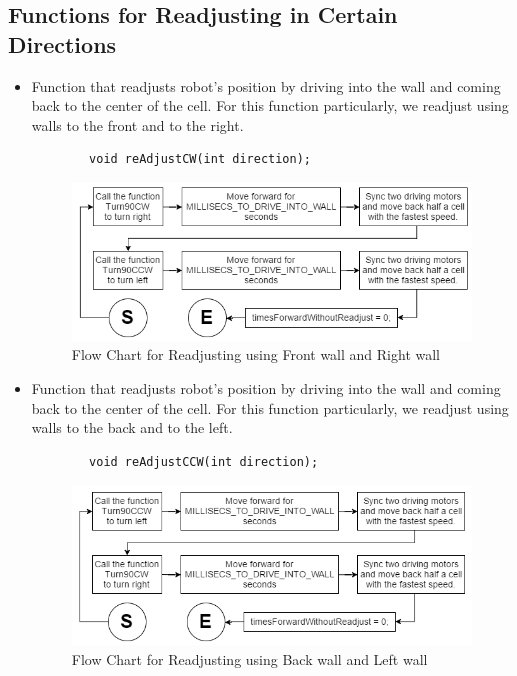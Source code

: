 \documentclass[11pt]{article}
\begin{document}
\subsection{Functions for Readjusting in Certain Directions}
\begin{itemize}
\item Function that readjusts robot's position by driving into the wall and coming back to the center of the cell. For this function particularly, we readjust using walls to the front and to the right.
	\begin{verbatim}
		void reAdjustCW(int direction);
	\end{verbatim}
\begin{figure}[htp]
\centering
\includegraphics[scale=0.52]{images/Software_Flowchart/reAdjustCW.png}
\caption{Flow Chart for Readjusting using Front wall and Right wall}
\label{}
\end{figure}
\item Function that readjusts robot's position by driving into the wall and coming back to the center of the cell. For this function particularly, we readjust using walls to the back and to the left.
	\begin{verbatim}
		void reAdjustCCW(int direction);
	\end{verbatim}
\begin{figure}[htp]
\centering
\includegraphics[scale=0.52]{images/Software_Flowchart/reAdjustCCW.png}
\caption{Flow Chart for Readjusting using Back wall and Left wall}

\end{figure}
\end{itemize}
\end{document}
